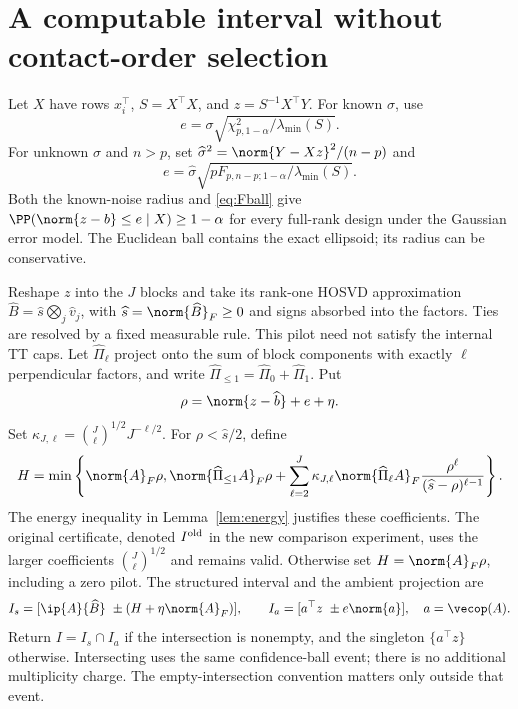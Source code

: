 \section{A computable interval without contact-order selection}\label{sec:method}
Let $X$ have rows $x_i^\top$, $S=X^\top X$, and $z=S^{-1}X^\top Y$. For known $\sigma$, use
\[
 e=\sigma\sqrt{\chi^2_{p,1-\alpha}/\lambda_{\min}(S)}.
\]
For unknown $\sigma$ and $n>p$, set $\widehat\sigma^2=\norm{Y-Xz}^2/(n-p)$ and
\begin{equation}\label{eq:Fball}
 e=\widehat\sigma\sqrt{pF_{p,n-p;1-\alpha}/\lambda_{\min}(S)}.
\end{equation}
Both the known-noise radius and \eqref{eq:Fball} give $\PP(\norm{z-b}\le e\mid X)\ge1-\alpha$ for every full-rank design under the Gaussian error model. The Euclidean ball contains the exact ellipsoid; its radius can be conservative.

Reshape $z$ into the $J$ blocks and take its rank-one HOSVD approximation $\widehat B=\widehat s\bigotimes_j\widehat v_j$, with $\widehat s=\norm{\widehat B}_F\ge0$ and signs absorbed into the factors. Ties are resolved by a fixed measurable rule. This pilot need not satisfy the internal TT caps. Let $\widehat\Pi_\ell$ project onto the sum of block components with exactly $\ell$ perpendicular factors, and write $\widehat\Pi_{\le1}=\widehat\Pi_0+\widehat\Pi_1$. Put
\[
 \rho=\norm{z-\widehat b}+e+\eta.
\]
Set $\kappa_{J,\ell}=\binom J\ell^{1/2}J^{-\ell/2}$. For $\rho<\widehat s/2$, define
\begin{equation}\label{eq:graded}
 H=\min\left\{\norm{A}_F\rho,
 \norm{\widehat\Pi_{\le1}A}_F\rho+
 \sum_{\ell=2}^J \kappa_{J,\ell}
 \norm{\widehat\Pi_\ell A}_F
 \frac{\rho^\ell}{(\widehat s-\rho)^{\ell-1}}\right\}.
\end{equation}
The energy inequality in Lemma~\ref{lem:energy} justifies these coefficients. The original certificate, denoted $I^{\rm old}$ in the new comparison experiment, uses the larger coefficients $\binom J\ell^{1/2}$ and remains valid. Otherwise set $H=\norm{A}_F\rho$, including a zero pilot. The structured interval and the ambient projection are
\[
 I_s=[\ip{A}{\widehat B}\ \pm(H+\eta\norm{A}_F)],\qquad
 I_a=[a^\top z\ \pm e\norm{a}],\quad a=\vecop(A).
\]
Return $I=I_s\cap I_a$ if the intersection is nonempty, and the singleton $\{a^\top z\}$ otherwise. Intersecting uses the same confidence-ball event; there is no additional multiplicity charge. The empty-intersection convention matters only outside that event.


